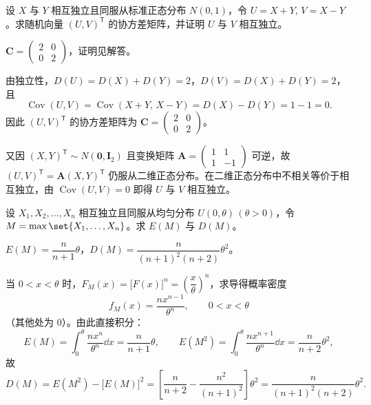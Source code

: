 \begin{exercise}
设 $X$ 与 $Y$ 相互独立且同服从标准正态分布 $N(0,1)$，令 $U=X+Y,\,V=X-Y$。求随机向量 $(U,V)^{\mathsf{T}}$ 的协方差矩阵，并证明 $U$ 与 $V$ 相互独立。
\begin{answer}
$\bm{C}=\begin{pmatrix} 2 & 0 \\ 0 & 2 \end{pmatrix}$，证明见解答。
\end{answer}
\begin{solution}
由独立性，$D(U)=D(X)+D(Y)=2$，$D(V)=D(X)+D(Y)=2$，且
\[
  \operatorname{Cov}(U,V)=\operatorname{Cov}(X+Y,\,X-Y)=D(X)-D(Y)=1-1=0.
\]
因此 $(U,V)^{\mathsf{T}}$ 的协方差矩阵为 $\bm{C}=\begin{pmatrix} 2 & 0 \\ 0 & 2 \end{pmatrix}$。

又因 $(X,Y)^{\mathsf{T}}\sim N(\bm{0},\bm{I}_2)$ 且变换矩阵 $\bm{A}=\begin{pmatrix} 1 & 1 \\ 1 & -1 \end{pmatrix}$ 可逆，故 $(U,V)^{\mathsf{T}}=\bm{A}(X,Y)^{\mathsf{T}}$ 仍服从二维正态分布。在二维正态分布中不相关等价于相互独立，由 $\operatorname{Cov}(U,V)=0$ 即得 $U$ 与 $V$ 相互独立。
\end{solution}
\end{exercise}

\begin{exercise}
设 $X_1,X_2,\ldots,X_n$ 相互独立且同服从均匀分布 $U(0,\theta)\,(\theta>0)$，令 $M=\max\set{X_1,\ldots,X_n}$。求 $E(M)$ 与 $D(M)$。
\begin{answer}
$E(M)=\dfrac{n}{n+1}\theta$，$D(M)=\dfrac{n}{(n+1)^2(n+2)}\theta^2$。
\end{answer}
\begin{solution}
当 $0<x<\theta$ 时，$F_M(x)=\bigl[F(x)\bigr]^n=\left(\dfrac{x}{\theta}\right)^n$，求导得概率密度
\[
  f_M(x)=\frac{n x^{n-1}}{\theta^n},\qquad 0<x<\theta
\]
（其他处为 $0$）。由此直接积分：
\[
  E(M)=\int_{0}^{\theta}\frac{n x^n}{\theta^n}\dd x=\frac{n}{n+1}\theta,\qquad
  E(M^2)=\int_{0}^{\theta}\frac{n x^{n+1}}{\theta^n}\dd x=\frac{n}{n+2}\theta^2,
\]
故
\[
  D(M)=E(M^2)-\bigl[E(M)\bigr]^2
  =\left[\frac{n}{n+2}-\frac{n^2}{(n+1)^2}\right]\theta^2
  =\frac{n}{(n+1)^2(n+2)}\theta^2.
\]
\end{solution}
\end{exercise}

